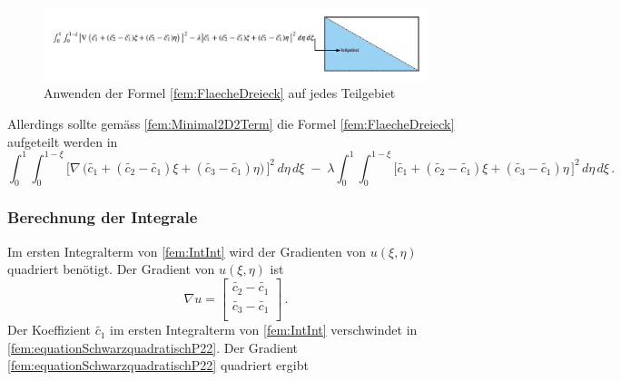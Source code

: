 \begin{figure}[h!]
	\centering
	\includegraphics[scale=0.6]{papers/fem/Images/FoTeilgebiet.jpeg}
	\caption{Anwenden der Formel \eqref{fem:FlaecheDreieck} auf jedes Teilgebiet}
	\label{fig:schemNMR_vorlage}
\end{figure}
Allerdings sollte gemäss \eqref{fem:Minimal2D2Term} die Formel \eqref{fem:FlaecheDreieck} aufgeteilt werden in
\begin{equation}
\int_0^1 \int_0^{1 - \xi} \bigl[ \nabla \, \bigl( \tilde{c_1} + (\tilde{c_2} - \tilde{c_1})\xi + (\tilde{c_3} - \tilde{c_1})\eta \bigr) \, \bigr]^2 \, d \eta \, d \xi \; - \; \lambda \int_0^1 \int_0^{1 - \xi} \bigl[\tilde{c_1} + (\tilde{c_2} - \tilde{c_1})\xi + (\tilde{c_3} - \tilde{c_1})\eta \, \bigr]^2 \, d \eta  \, d \xi \, .
\label{fem:IntInt}
\end{equation}

\subsubsection{Berechnung der Integrale}

Im ersten Integralterm von \eqref{fem:IntInt} wird der Gradienten von $u(\xi, \eta)$  quadriert benötigt. Der Gradient von $u(\xi, \eta)$ ist 
\begin{equation}
	\nabla u = 	
	\left[ \begin{array}{r}
	\tilde{c_2} - \tilde{c_1} \\
	\tilde{c_3} - \tilde{c_1} \\
	\end{array}\right] \, .
	\label{fem:equationSchwarzquadratischP22}
\end{equation} 
Der Koeffizient $\tilde{c_1}$ im ersten Integralterm von \eqref{fem:IntInt} verschwindet in \eqref{fem:equationSchwarzquadratischP22}. Der Gradient \ref{fem:equationSchwarzquadratischP22} quadriert ergibt

